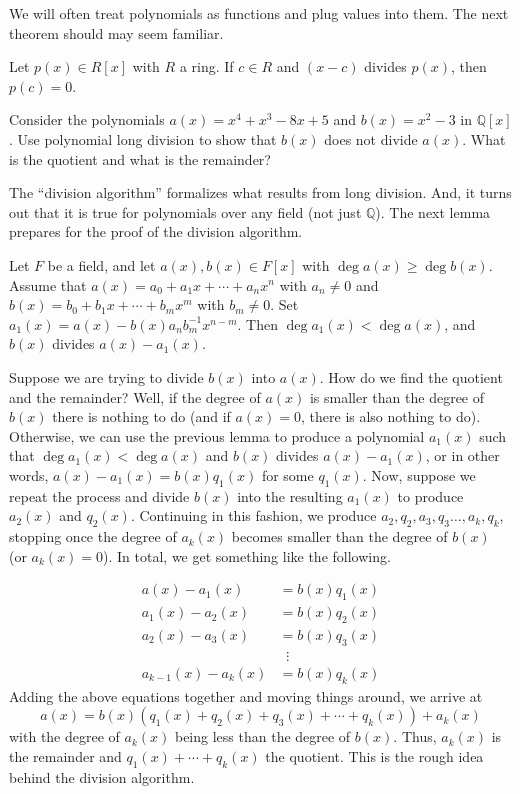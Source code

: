 We will often treat polynomials as functions and plug values into them. The next theorem should may seem familiar.

\begin{theorem}\label{thm.LinearFactorOfPolyImpliesRoot}
Let $p(x)\in R[x]$ with $R$ a ring. If $c\in R$ and $(x-c)$ divides $p(x)$, then $p(c) = 0$.
\end{theorem}

\begin{problem}
Consider the polynomials $a(x) = x^4+x^3-8x +5$  and $b(x) = x^2 -3$ in $\mathbb{Q}[x]$. Use polynomial long division to show that $b(x)$ does not divide $a(x)$. What is the quotient and what is the remainder? 
\end{problem}

The ``division algorithm'' formalizes what results from long division. And, it turns out that it is true for polynomials over any field (not just $\mathbb{Q}$). The next lemma prepares for the proof of the division algorithm. 

\begin{lemma}
Let $F$ be a field, and let $a(x),b(x)\in F[x]$ with $\deg a(x)\ge \deg b(x)$. Assume that $a(x) = a_0 + a_1x + \cdots + a_nx^n$ with $a_n\neq 0$ and $b(x) = b_0 + b_1x + \cdots + b_mx^m$ with $b_m\neq 0$. Set $a_1(x) =  a(x) - b(x)a_nb_m^{-1}x^{n-m}$. Then $\deg a_1(x) < \deg a(x)$, and $b(x)$ divides $a(x) - a_1(x)$.
\end{lemma}

Suppose we are trying to divide $b(x)$ into $a(x)$. How do we find the quotient and the remainder? Well, if the degree of $a(x)$ is smaller than the degree of $b(x)$ there is nothing to do (and if $a(x) = 0$, there is also nothing to do). Otherwise, we can use the previous lemma to produce a polynomial $a_1(x)$ such that $\deg a_1(x) < \deg a(x)$ and $b(x)$ divides $a(x) - a_1(x)$, or in other words, $a(x) - a_1(x) = b(x)q_1(x)$ for some $q_1(x)$. Now, suppose we repeat the process and divide $b(x)$ into the resulting $a_1(x)$ to produce $a_2(x)$ and $q_2(x)$. Continuing in this fashion, we produce $a_2, q_2, a_3,q_3 \ldots, a_k,q_k$, stopping once the degree of $a_k(x)$ becomes smaller than the degree of $b(x)$ (or $a_k(x)=0$). In total, we get something like the following.

\begin{align*}
a(x) - a_1(x) & = b(x)q_1(x)\\
a_1(x) - a_2(x) & = b(x)q_2(x)\\
a_2(x) - a_3(x) & = b(x)q_3(x)\\
& \;\;\vdots\\ 
a_{k-1}(x) - a_{k}(x) & = b(x)q_k(x)
\end{align*}
Adding the above equations together and moving things around, we arrive at  \[a(x) = b(x)\left(q_1(x) + q_2(x) + q_3(x) +\cdots + q_k(x)\right) + a_k(x)\]
with the degree of $a_k(x)$ being less than the degree of $b(x)$. Thus, $a_k(x)$  is the remainder and $q_1(x) +\cdots + q_k(x)$ the quotient. This is the rough idea behind the division algorithm.

